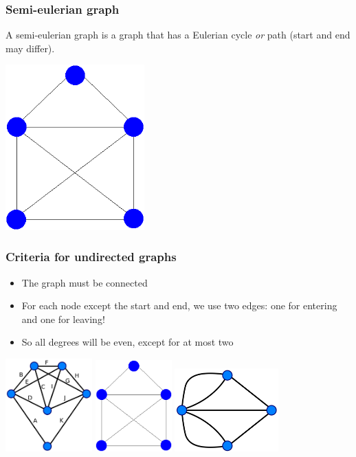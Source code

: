 \documentclass[12pt]{beamer}
\begin{document}
\begin{frame}
\frametitle{Semi-eulerian graph}
A semi-eulerian graph is a graph that has a Eulerian cycle \emph{or} path (start and end may differ).
\begin{center}
\includegraphics[width=0.4\textwidth]{img/semi-eulerian}
\end{center}
\end{frame}

\begin{frame}
\frametitle{Criteria for undirected graphs}
\begin{itemize}
\item The graph must be connected
\item For each node except the start and end, we use two edges: one for entering and one for leaving!
\item So all degrees will be even, except for at most two
\end{itemize}
\begin{center}
\includegraphics[width=0.25\textwidth]{img/euler-graph}
\qquad
\includegraphics[width=0.22\textwidth]{img/semi-eulerian}
\qquad
\includegraphics[width=0.3\textwidth]{img/konigsberg}
\end{center}
\end{frame}
\end{document}
